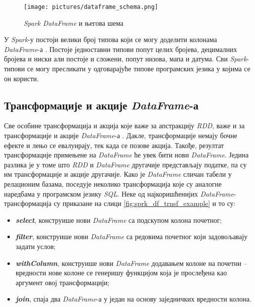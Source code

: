 \documentclass[12pt,oneside]{memoir}
\begin{document}
\begin{figure}[!ht]
  \centering
  \texttt{[image: pictures/dataframe\_schema.png]}
  \caption{\textit{Spark DataFrame} и његова шема}
  \label{fig:sprk_df_schema_example}
\end{figure}

У \textit{Spark}-у постоји велики број типова који се могу доделити колонама \textit{DataFrame}-а \cite{spark_guide}. Постоје једноставни типови попут целих бројева, децималних бројева и ниски али постоје и сложени, попут низова, мапа и датума. Сви \textit{Spark}-типови се могу пресликати у одговарајуће типове програмских језика у којима се он користи.

\subsection{Трансформације и акције \textit{DataFrame}-а}
\label{subsec:spark_sql_ac_tr}

Све особине трансформација и акција које важе за апстракцију \textit{RDD}, важе и за трансформације и акције \textit{DataFrame}-а \cite{spark_guide}. Дакле, трансформације немају бочне ефекте и лењо се евалуирају, тек када се позове акција. Такође, резултат трансформације примењене на \textit{DataFrame} ће увек бити нови \textit{DataFrame}. Једина разлика је у томе што \textit{RDD} и \textit{DataFrame} другачије представљају податке, па су им трансформације и акције другачије. Како је \textit{DataFrame} сличан табели у релационим базама, поседује неколико трансформација које су аналогне наредбама у програмском језику \textit{SQL}. Неке од најкоришћенијих \textit{DataFrame}-трансформација су приказане на слици \ref{fig:sprk_df_trnsf_example} и то су:

\begin{itemize} 
	\item \textbf{\textit{select}}, конструише нови \textit{DataFrame} са подскупом колона почетног;
	\item \textbf{\textit{filter}}, конструише нови \textit{DataFrame} са редовима почетног који задовољавају задати услов;
	\item \textbf{\textit{withColumn}}, конструише нови \textit{DataFrame} додавањем колоне на почетни -- вредности нове колоне се генеришу функцијом која је прослеђена као аргумент овој трансформацији;
	\item \textbf{\textit{join}}, спаја два \textit{DataFrame}-а у један на основу заједничких вредности колона.
\end{itemize}
\end{document}
